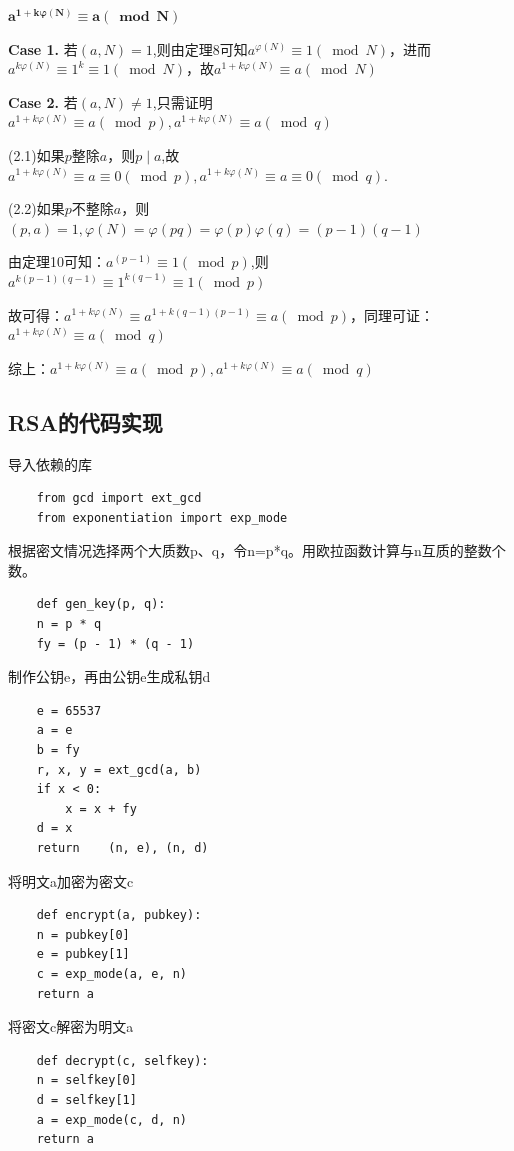 \documentclass[12pt,hyperref,a4paper,UTF8]{ctexart}
\begin{document}
$\bm{a^{1+k \varphi(N)} \equiv a(\bmod N)}$\par 
\vskip 5pt
\textbf{Case 1.} 若$(a,N)=1$,则由定理8可知$ a^{\varphi(N)} \equiv 1(\bmod N)$，进而$ a^{k\varphi(N)} \equiv 1^k \equiv 1 (\bmod N)$，故$ a^{1+k\varphi(N)} \equiv a(\bmod N)$\par 
\textbf{Case 2.} 若$(a,N)\not =1$,只需证明$a^{1+k \varphi(N)} \equiv a(\bmod p),a^{1+k \varphi(N)} \equiv a(\bmod q)$\par 
(2.1)如果$p$整除$a$，则$  p \mid a $,故$a^{1+k \varphi(N)} \equiv a \equiv 0 (\bmod p),a^{1+k \varphi(N)} \equiv a \equiv 0(\bmod q)$.\par 
(2.2)如果$p$不整除$a$，则$(p,a)=1, \varphi\left(N\right)= \varphi\left(pq\right)=\varphi\left(p\right)\varphi\left(q\right)=(p-1)(q-1)$\par
由定理10可知：$a^{(p-1)} \equiv 1(\bmod p) $,则$a^{k(p-1)(q-1)} \equiv 1^{k(q-1)} \equiv 1 (\bmod p) $\par 
故可得：$a^{1+k \varphi(N)} \equiv a^{1+k (q-1)(p-1)}  \equiv a (\bmod p)$，同理可证：$a^{1+k \varphi(N)} \equiv a(\bmod q)$\par 
综上：$a^{1+k \varphi(N)} \equiv a(\bmod p),a^{1+k \varphi(N)} \equiv a(\bmod q)$\par 

\subsection{RSA的代码实现}
导入依赖的库
\begin{lstlisting}
    from gcd import ext_gcd
    from exponentiation import exp_mode
\end{lstlisting}
根据密文情况选择两个大质数p、q，令n=p*q。用欧拉函数计算与n互质的整数个数。
\begin{lstlisting}
    def gen_key(p, q):
    n = p * q                
    fy = (p - 1) * (q - 1)      
\end{lstlisting}
制作公钥e，再由公钥e生成私钥d
\begin{lstlisting}
    e = 65537                   
    a = e
    b = fy
    r, x, y = ext_gcd(a, b)   
    if x < 0:
        x = x + fy
    d = x    
    return    (n, e), (n, d)
\end{lstlisting}
将明文a加密为密文c
\begin{lstlisting}
    def encrypt(a, pubkey):
    n = pubkey[0]
    e = pubkey[1]
    c = exp_mode(a, e, n)
    return a
\end{lstlisting}
将密文c解密为明文a
\begin{lstlisting}
    def decrypt(c, selfkey):
    n = selfkey[0]
    d = selfkey[1]
    a = exp_mode(c, d, n)
    return a
\end{lstlisting}
\end{document}
